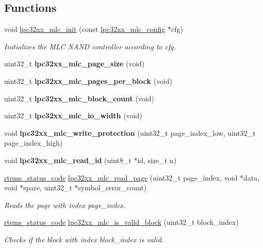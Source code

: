 \subsection*{Functions}
\begin{DoxyCompactItemize}
\item 
void \mbox{\hyperlink{group__lpc32xx__nand__mlc_ga223b19df7910441502b54c1561f29dcb}{lpc32xx\+\_\+mlc\+\_\+init}} (const \mbox{\hyperlink{structlpc32xx__mlc__config}{lpc32xx\+\_\+mlc\+\_\+config}} $\ast$cfg)
\begin{DoxyCompactList}\small\item\em Initializes the M\+LC N\+A\+ND controller according to {\itshape cfg}. \end{DoxyCompactList}\item 
uint32\+\_\+t {\bfseries lpc32xx\+\_\+mlc\+\_\+page\+\_\+size} (void)
\item 
uint32\+\_\+t {\bfseries lpc32xx\+\_\+mlc\+\_\+pages\+\_\+per\+\_\+block} (void)
\item 
uint32\+\_\+t {\bfseries lpc32xx\+\_\+mlc\+\_\+block\+\_\+count} (void)
\item 
uint32\+\_\+t {\bfseries lpc32xx\+\_\+mlc\+\_\+io\+\_\+width} (void)
\item 
void {\bfseries lpc32xx\+\_\+mlc\+\_\+write\+\_\+protection} (uint32\+\_\+t page\+\_\+index\+\_\+low, uint32\+\_\+t page\+\_\+index\+\_\+high)
\item 
void {\bfseries lpc32xx\+\_\+mlc\+\_\+read\+\_\+id} (uint8\+\_\+t $\ast$id, size\+\_\+t n)
\item 
\mbox{\hyperlink{group__ClassicStatus_ga545d41846817eaba6143d52ee4d9e9fe}{rtems\+\_\+status\+\_\+code}} \mbox{\hyperlink{group__lpc32xx__nand__mlc_gad998b76b7200ed71c4a99422ae2f036c}{lpc32xx\+\_\+mlc\+\_\+read\+\_\+page}} (uint32\+\_\+t page\+\_\+index, void $\ast$data, void $\ast$spare, uint32\+\_\+t $\ast$symbol\+\_\+error\+\_\+count)
\begin{DoxyCompactList}\small\item\em Reads the page with index {\itshape page\+\_\+index}. \end{DoxyCompactList}\item 
\mbox{\hyperlink{group__ClassicStatus_ga545d41846817eaba6143d52ee4d9e9fe}{rtems\+\_\+status\+\_\+code}} \mbox{\hyperlink{group__lpc32xx__nand__mlc_gad2e1dff4507a4ba350d817a1493cad5f}{lpc32xx\+\_\+mlc\+\_\+is\+\_\+valid\+\_\+block}} (uint32\+\_\+t block\+\_\+index)
\begin{DoxyCompactList}\small\item\em Checks if the block with index {\itshape block\+\_\+index} is valid. \end{DoxyCompactList}\item 

\end{DoxyCompactItemize}
